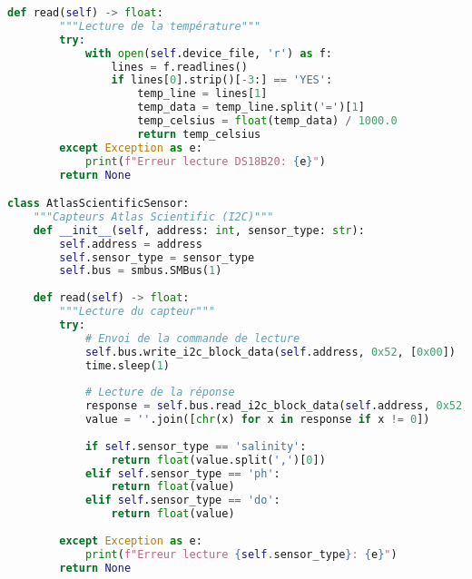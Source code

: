 \begin{lstlisting}[language=Python, caption=Gestionnaire des capteurs, label=lst:sensor-manager]
    def read(self) -> float:
        """Lecture de la température"""
        try:
            with open(self.device_file, 'r') as f:
                lines = f.readlines()
                if lines[0].strip()[-3:] == 'YES':
                    temp_line = lines[1]
                    temp_data = temp_line.split('=')[1]
                    temp_celsius = float(temp_data) / 1000.0
                    return temp_celsius
        except Exception as e:
            print(f"Erreur lecture DS18B20: {e}")
        return None

class AtlasScientificSensor:
    """Capteurs Atlas Scientific (I2C)"""
    def __init__(self, address: int, sensor_type: str):
        self.address = address
        self.sensor_type = sensor_type
        self.bus = smbus.SMBus(1)
    
    def read(self) -> float:
        """Lecture du capteur"""
        try:
            # Envoi de la commande de lecture
            self.bus.write_i2c_block_data(self.address, 0x52, [0x00])
            time.sleep(1)
            
            # Lecture de la réponse
            response = self.bus.read_i2c_block_data(self.address, 0x52, 32)
            value = ''.join([chr(x) for x in response if x != 0])
            
            if self.sensor_type == 'salinity':
                return float(value.split(',')[0])
            elif self.sensor_type == 'ph':
                return float(value)
            elif self.sensor_type == 'do':
                return float(value)
                
        except Exception as e:
            print(f"Erreur lecture {self.sensor_type}: {e}")
        return None
\end{lstlisting}

